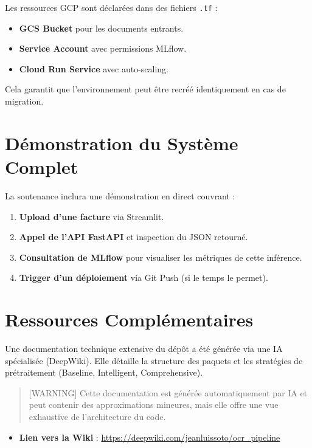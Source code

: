 \documentclass[
  letterpaper,
  DIV=11,
  numbers=noendperiod]{scrartcl}
\providecommand{\tightlist}{%
  \setlength{\itemsep}{0pt}\setlength{\parskip}{0pt}}
\begin{document}
Les ressources GCP sont déclarées dans des fichiers \texttt{.tf} :

\begin{itemize}
\tightlist
\item
  \textbf{GCS Bucket} pour les documents entrants.
\item
  \textbf{Service Account} avec permissions MLflow.
\item
  \textbf{Cloud Run Service} avec auto-scaling.
\end{itemize}

Cela garantit que l'environnement peut être recréé identiquement en cas
de migration.

\section{Démonstration du Système
Complet}\label{duxe9monstration-du-systuxe8me-complet}

La soutenance inclura une démonstration en direct couvrant :

\begin{enumerate}
\def\labelenumi{\arabic{enumi}.}
\tightlist
\item
  \textbf{Upload d'une facture} via Streamlit.
\item
  \textbf{Appel de l'API FastAPI} et inspection du JSON retourné.
\item
  \textbf{Consultation de MLflow} pour visualiser les métriques de cette
  inférence.
\item
  \textbf{Trigger d'un déploiement} via Git Push (si le temps le
  permet).
\end{enumerate}

\section{Ressources
Complémentaires}\label{ressources-compluxe9mentaires}

Une documentation technique extensive du dépôt a été générée via une IA
spécialisée (DeepWiki). Elle détaille la structure des paquets et les
stratégies de prétraitement (Baseline, Intelligent, Comprehensive).

\begin{quote}
{[}WARNING{]} Cette documentation est générée automatiquement par IA et
peut contenir des approximations mineures, mais elle offre une vue
exhaustive de l'architecture du code.
\end{quote}

\begin{itemize}
\tightlist
\item
  \textbf{Lien vers la Wiki} :
  \url{https://deepwiki.com/jeanluissoto/ocr_pipeline}
\end{itemize}
\end{document}
